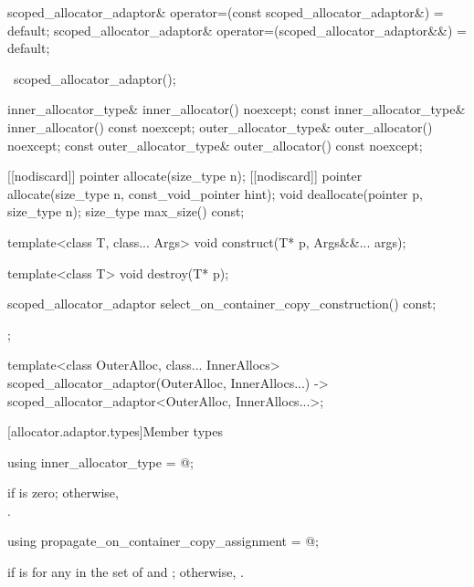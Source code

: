 \begin{codeblock}
{{    scoped_allocator_adaptor& operator=(const scoped_allocator_adaptor&) = default;
    scoped_allocator_adaptor& operator=(scoped_allocator_adaptor&&) = default;

    ~scoped_allocator_adaptor();

    inner_allocator_type& inner_allocator() noexcept;
    const inner_allocator_type& inner_allocator() const noexcept;
    outer_allocator_type& outer_allocator() noexcept;
    const outer_allocator_type& outer_allocator() const noexcept;

    [[nodiscard]] pointer allocate(size_type n);
    [[nodiscard]] pointer allocate(size_type n, const_void_pointer hint);
    void deallocate(pointer p, size_type n);
    size_type max_size() const;

    template<class T, class... Args>
      void construct(T* p, Args&&... args);

    template<class T>
      void destroy(T* p);

    scoped_allocator_adaptor select_on_container_copy_construction() const;
  };

  template<class OuterAlloc, class... InnerAllocs>
    scoped_allocator_adaptor(OuterAlloc, InnerAllocs...)
      -> scoped_allocator_adaptor<OuterAlloc, InnerAllocs...>;
}
\end{codeblock}

[allocator.adaptor.types]{Member types}

%
\begin{itemdecl}
using inner_allocator_type = @\seebelow@;
\end{itemdecl}

\begin{itemdescr}
\pnum
\ctype {} if  is
zero; otherwise,\\ .
\end{itemdescr}

%
\begin{itemdecl}
using propagate_on_container_copy_assignment = @\seebelow@;
\end{itemdecl}

\begin{itemdescr}
\pnum
\ctype {} if
 is
 for any  in the set of  and
; otherwise, .
\end{itemdescr}

